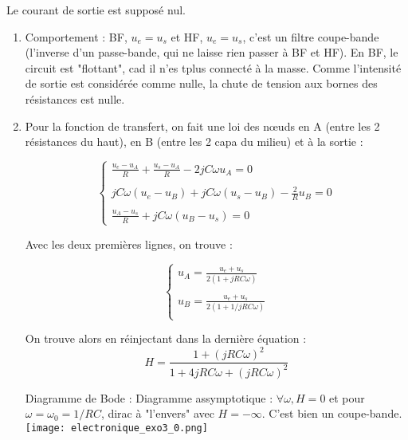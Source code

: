 \begin{correction}

Le courant de sortie est supposé nul.

\begin{enumerate}
	\item Comportement : BF, $u_e=u_s$ et HF, $u_e=u_s$, c'est un filtre coupe-bande (l'inverse d'un passe-bande, qui ne laisse rien passer à BF et HF). En BF, le circuit est "flottant", cad il n'es tplus connecté à la masse. Comme l'intensité de sortie est considérée comme nulle, la chute de tension aux bornes des résistances est nulle.
	
	\item
		Pour la fonction de transfert, on fait une loi des nœuds en A (entre les 2 résistances du haut), en B (entre les 2 capa du milieu) et à la sortie :
		
\begin{equation}
	\left\lbrace
	\begin{array}{lll}
		 \frac{u_e-u_A}{R} + \frac{u_s-u_A}{R} -2jC\omega u_A = 0\\
		 \\
		 jC\omega(u_e-u_B) +  jC\omega(u_s-u_B) - \frac{2}{R}u_B =0  \\
		 \\
		 \frac{u_A-u_s}{R} + jC\omega(u_B-u_s)=0
	\end{array}\right.
\end{equation}

Avec les deux premières lignes, on trouve :

\begin{equation}
	\left\lbrace
	\begin{array}{lll}
		 u_A = \frac{u_e+u_s}{2(1+jRC\omega)}\\
		 \\
		 u_B = \frac{u_e+u_s}{2(1+1/jRC\omega)} \\
	\end{array}\right.
\end{equation}

	On trouve alors en réinjectant dans la dernière équation :
	\begin{equation}
		H =\frac{1+(jRC\omega)^2}{1+4jRC\omega + (jRC\omega)^2}
	\end{equation}
	
	Diagramme de Bode :
Diagramme assymptotique :  $\forall \omega, H=0$ et pour $\omega=\omega_0=1/RC$, dirac à "l'envers" avec $H=-\infty$. C'est bien un coupe-bande.
	\centering
	\texttt{[image: electronique\_exo3\_0.png]}


\end{enumerate}
\end{correction}
